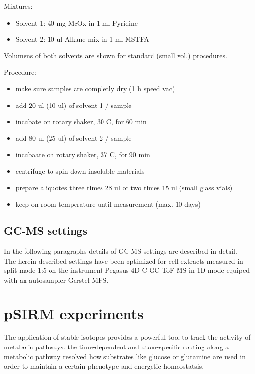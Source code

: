 \documentclass[]{book}
\providecommand{\tightlist}{%
  \setlength{\itemsep}{0pt}\setlength{\parskip}{0pt}}
\begin{document}
Mixtures:

\begin{itemize}
\tightlist
\item
  Solvent 1: 40 mg MeOx in 1 ml Pyridine
\item
  Solvent 2: 10 ul Alkane mix in 1 ml MSTFA
\end{itemize}

Volumens of both solvents are shown for standard (small vol.) procedures.

Procedure:

\begin{itemize}
\tightlist
\item
  make sure samples are completly dry (1 h speed vac)
\item
  add 20 ul (10 ul) of solvent 1 / sample
\item
  incubate on rotary shaker, 30 C, for 60 min
\item
  add 80 ul (25 ul) of solvent 2 / sample
\item
  incubaate on rotary shaker, 37 C, for 90 min
\item
  centrifuge to spin down insoluble materials
\item
  prepare aliquotes three times 28 ul or two times 15 ul (small glass vials)
\item
  keep on room temperature until measurement (max. 10 days)
\end{itemize}

\hypertarget{gcms}{%
\section{GC-MS settings}\label{gcms}}

In the following paragraphs details of GC-MS settings are described in detail. The herein described settings have been optimized for cell extracts measured in split-mode 1:5 on the instrument Pegasus 4D-C GC-ToF-MS in 1D mode equiped with an autosampler Gerstel MPS.

\hypertarget{psirm}{%
\chapter{pSIRM experiments}\label{psirm}}

The application of stable isotopes provides a powerful tool to track the activity of metabolic pathways.
the time-dependent and atom-specific routing along a metabolic pathway resolved how substrates like glucose or glutamine are used in order to maintain a certain phenotype and energetic homeostatsis.
\end{document}
